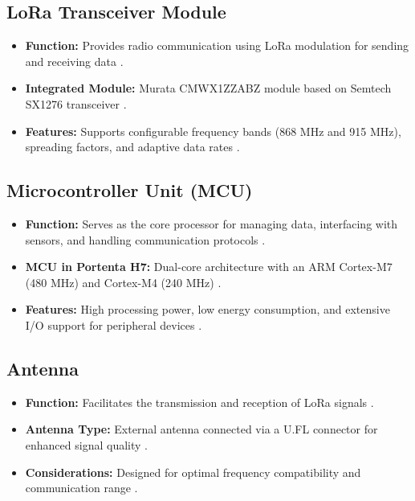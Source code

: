 \subsection{LoRa Transceiver Module}
\begin{itemize}
	\item \textbf{Function:} Provides radio communication using LoRa modulation for sending and receiving data \cite{semtech_sx1276:2025}.
	\item \textbf{Integrated Module:} Murata CMWX1ZZABZ module based on Semtech SX1276 transceiver \cite{murata_transceiver:2025}.
	\item \textbf{Features:} Supports configurable frequency bands (868 MHz and 915 MHz), spreading factors, and adaptive data rates \cite{semtech_sx1276:2025}.
\end{itemize}

\subsection{Microcontroller Unit (MCU)}
\begin{itemize}
	\item \textbf{Function:} Serves as the core processor for managing data, interfacing with sensors, and handling communication protocols .
	\item \textbf{MCU in Portenta H7:} Dual-core architecture with an ARM Cortex-M7 (480 MHz) and Cortex-M4 (240 MHz) .
	\item \textbf{Features:} High processing power, low energy consumption, and extensive I/O support for peripheral devices \cite{arduino_portenta:2025}.
\end{itemize}

\subsection{Antenna}
\begin{itemize}
	\item \textbf{Function:} Facilitates the transmission and reception of LoRa signals \cite{semtech_lora:2025}.
	\item \textbf{Antenna Type:} External antenna connected via a U.FL connector for enhanced signal quality \cite{murata_transceiver:2025}.
	\item \textbf{Considerations:} Designed for optimal frequency compatibility and communication range \cite{semtech_lora:2025}.
\end{itemize}

